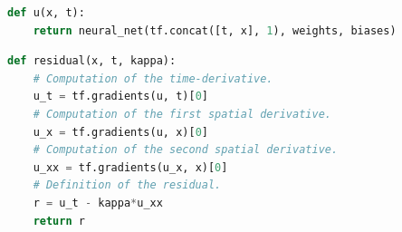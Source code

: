 \documentclass[aspectratio=169,compress,12pt,dvipsnames]{beamer}
\def\nstyle{int(\lay<\Nnodlen?min(2,\lay):3)} %
\begin{document}
\begin{frame}
  \vfill
  \centering
  \vfill
\end{frame}

\begin{frame}[fragile]{}
  \vfill
  \centering
  \begin{lstlisting}[language=Python]
  def u(x, t):
    return neural_net(tf.concat([t, x], 1), weights, biases)
  \end{lstlisting}
  \vfill
\end{frame}

\begin{frame}[fragile]{}
  \vfill
  \centering
  \begin{lstlisting}[language=Python]
  def residual(x, t, kappa):
    # Computation of the time-derivative.
    u_t = tf.gradients(u, t)[0]
    # Computation of the first spatial derivative.
    u_x = tf.gradients(u, x)[0]
    # Computation of the second spatial derivative.
    u_xx = tf.gradients(u_x, x)[0]
    # Definition of the residual.
    r = u_t - kappa*u_xx
    return r
  \end{lstlisting}
  \vfill
\end{frame}
\end{document}
